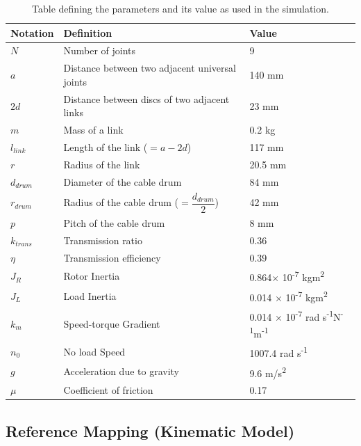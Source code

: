 \documentclass[a4paper,12pt]{report}
\begin{document}
\begin{table}[H]
	\begingroup
	\renewcommand{\arraystretch}{1.5}
	\begin{tabular}{|p{1.8cm}|p{5.4cm}|p{5cm}|}
\hline
\textbf{Notation} & \textbf{Definition} & \textbf{Value} \\
\hline
$N$ & Number of joints & 9 \\
$a$ & Distance between two adjacent universal joints & 140 mm\\
$2d$ & Distance between discs of two adjacent links & 23 mm\\
$m$ & Mass of a link & 0.2 kg\\
$l_{link}$ & Length of the link ($ = a-2d $) & 117 mm\\
$r$ & Radius of the link & 20.5 mm\\
$d_{drum}$ & Diameter of the cable drum & 84 mm\\
$r_{drum}$ & Radius of the cable drum ($ = \dfrac{d_{drum}}{2} $)& 42 mm\\
$p$ & Pitch of the cable drum & 8 mm\\
$k_{trans}$ & Transmission ratio & 0.36\\
$\eta$ & Transmission efficiency & 0.39\\
$J_R$ & Rotor Inertia & 0.864$ \times $ 10\textsuperscript{-7} kg\hspace{1mm}m\textsuperscript{2}\\
$J_L$ & Load Inertia & 0.014 $\times $ 10\textsuperscript{-7} kg\hspace{1mm}m\textsuperscript{2}\\
$k_m$ & Speed-torque Gradient& 0.014 $\times $ 10\textsuperscript{-7} rad s\textsuperscript{-1}N\textsuperscript{-1}m\textsuperscript{-1}\\
$n_0$ & No load Speed& 1007.4 rad s\textsuperscript{-1}\\
$g$ & Acceleration due to gravity & 9.6 m/s\textsuperscript{2} \\
$ \mu $ & Coefficient of friction & 0.17 \\
\hline
\end{tabular}
\endgroup
\caption{Table defining the parameters and its value as used in the simulation.}
\label{dynamic-params}
\end{table}


\subsection{Reference Mapping (Kinematic Model)}
\end{document}
